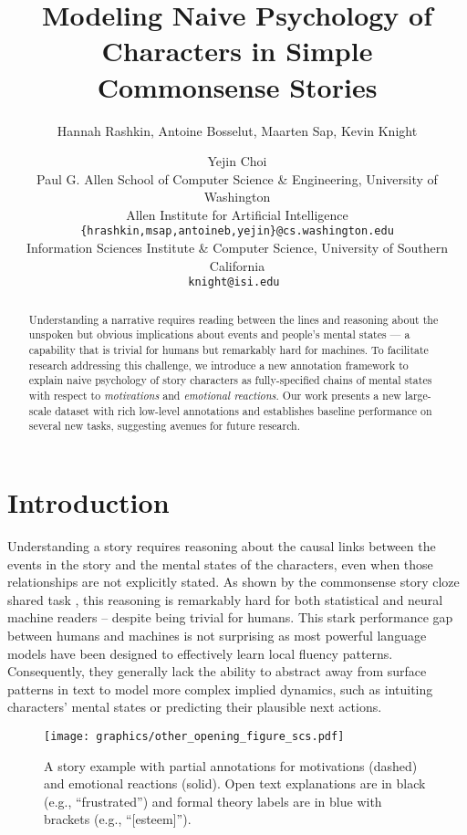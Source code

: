 \documentclass[11pt,a4paper]{article}
\title{
Modeling Naive Psychology of Characters in Simple Commonsense Stories
}
\author{
  Hannah Rashkin,
  Antoine Bosselut,
  Maarten Sap,
  Kevin Knight \and Yejin Choi \\
    Paul G. Allen School of Computer Science \& Engineering, University of Washington \\
    Allen Institute for Artificial Intelligence\\
  {\tt \{hrashkin,msap,antoineb,yejin\}@cs.washington.edu}\\
 Information Sciences Institute \& Computer Science, University of Southern California\\
  {\tt knight@isi.edu }
  }
\begin{document}
\maketitle

\begin{abstract}
Understanding a narrative requires reading between the lines and reasoning about the unspoken but obvious implications about events and people's mental states --- a capability that is trivial for humans but 
remarkably hard for machines.  
To facilitate research addressing this challenge, 
we introduce a new annotation framework to explain naive psychology of story characters as fully-specified chains of mental states with respect to  \emph{motivations} and \emph{emotional reactions}. Our work presents a new large-scale dataset with rich low-level annotations and establishes baseline performance on several new tasks, suggesting avenues for future research.










\end{abstract}

\section{Introduction}
\label{sec:intro}


Understanding a story requires reasoning about the causal links between the events in the story and the mental states of the characters, even when those relationships are not explicitly stated.
As shown by the commonsense story cloze shared task \cite{SharedTask}, this reasoning is remarkably hard for both statistical and neural machine readers -- despite being trivial for humans. 
This stark performance gap between humans and machines is not surprising as most powerful language models have been designed to effectively learn local fluency patterns. Consequently, they generally lack the ability to abstract away from surface patterns in text to model more complex implied dynamics, such as intuiting characters' mental states or predicting their plausible next actions. 


\begin{figure}\label{fig:story_motivation}
\begin{centering}
\vspace*{-2mm}
\texttt{[image: graphics/other\_opening\_figure\_scs.pdf]}
\vspace*{-3mm}
\caption{ A story example with partial annotations for motivations (dashed) and emotional  reactions (solid). 
Open text explanations are in black (e.g., ``frustrated'') and formal theory labels are in blue with brackets (e.g., ``[esteem]'').}
\vspace*{-2mm}
\label{introfigure}
\end{centering}
\end{figure}
\end{document}
